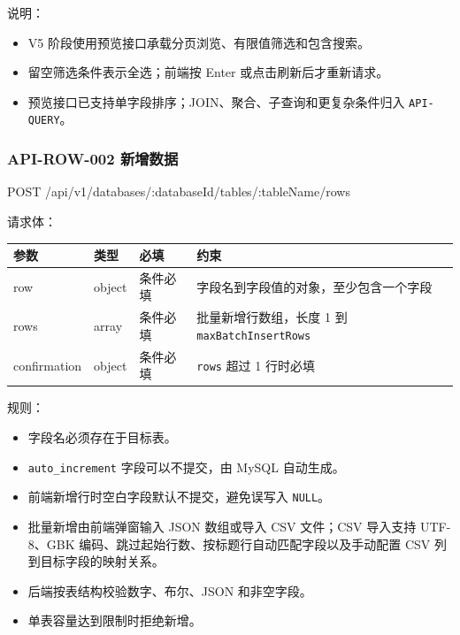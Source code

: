 \documentclass[
  a4paper,
  UTF8]{ctexart}
\newenvironment{Shaded}{}{}
\newcommand{\NormalTok}[1]{#1}
\providecommand{\tightlist}{%
  \setlength{\itemsep}{0pt}\setlength{\parskip}{0pt}}
\begin{document}
说明：

\begin{itemize}
\tightlist
\item
  V5 阶段使用预览接口承载分页浏览、有限值筛选和包含搜索。
\item
  留空筛选条件表示全选；前端按 Enter 或点击刷新后才重新请求。
\item
  预览接口已支持单字段排序；JOIN、聚合、子查询和更复杂条件归入
  \texttt{API-QUERY}。
\end{itemize}

\hypertarget{api-row-002-ux65b0ux589eux6570ux636e}{%
\subsubsection{API-ROW-002
新增数据}\label{api-row-002-ux65b0ux589eux6570ux636e}}

\begin{Shaded}
\begin{Highlighting}[]
\NormalTok{POST /api/v1/databases/:databaseId/tables/:tableName/rows}
\end{Highlighting}
\end{Shaded}

请求体：

\begin{longtable}[]{@{}llll@{}}
\toprule
参数 & 类型 & 必填 & 约束 \\
\midrule
\endhead
row & object & 条件必填 & 字段名到字段值的对象，至少包含一个字段 \\
rows & array & 条件必填 & 批量新增行数组，长度 1 到
\texttt{maxBatchInsertRows} \\
confirmation & object & 条件必填 & \texttt{rows} 超过 1 行时必填 \\
\bottomrule
\end{longtable}

规则：

\begin{itemize}
\tightlist
\item
  字段名必须存在于目标表。
\item
  \texttt{auto\_increment} 字段可以不提交，由 MySQL 自动生成。
\item
  前端新增行时空白字段默认不提交，避免误写入 \texttt{NULL}。
\item
  批量新增由前端弹窗输入 JSON 数组或导入 CSV 文件；CSV 导入支持
  UTF-8、GBK 编码、跳过起始行数、按标题行自动匹配字段以及手动配置 CSV
  列到目标字段的映射关系。
\item
  后端按表结构校验数字、布尔、JSON 和非空字段。
\item
  单表容量达到限制时拒绝新增。
\end{itemize}
\end{document}
